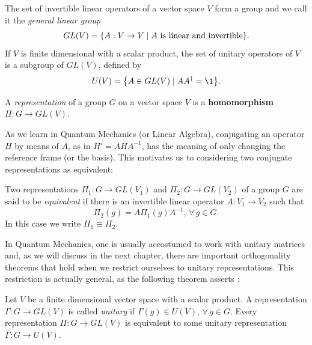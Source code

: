 \begin{definition}
The set of invertible linear operators of a vector space $V$ form a group and we call it the \textit{general linear group}
$$
GL(V) = \qty{A: V \to V \mid A \text{ is linear and invertible}}.
$$
If $V$ is finite dimensional with a scalar product, the set of unitary operators of $V$ is a subgroup of $GL(V)$, defined by
$$
U(V) = \qty{A \in GL(V) \mid A A^\dagger = \1}.
$$
\end{definition}

\begin{definition}
A \textit{representation} of a group $G$ on a vector space $V$ is a \textbf{homomorphism} $\Pi: G \to GL(V)$.
\end{definition}

As we learn in Quantum Mechanics (or Linear Algebra), conjugating an operator $H$ by means of $A$, as in $H' = A H A^{-1}$, has the meaning of only changing the reference frame (or the basis). This motivates us to considering two conjugate representations as equivalent:
\begin{definition}
Two representations $\Pi_1: G \to GL(V_1)$ and $\Pi_2: G \to GL(V_2)$ of a group $G$ are said to be \textit{equivalent} if there is an invertible linear operator $A: V_1 \to V_2$ such that
\begin{equation} \label{eq:intertwiner}
\Pi_2(g) = A \Pi_1(g) A^{-1}, \, \forall \, g \in G.
\end{equation}
In this case we write $\Pi_1 \equiv \Pi_2$.
\end{definition}

In Quantum Mechanics, one is usually accostumed to work with unitary matrices and, as we will discuss in the next chapter, there are important orthogonality theorems that hold when we restrict ourselves to unitary representations. This restriction is actually general, as the following theorem asserts \cite{dresselhaus}:
\begin{theorem} \label{th:unitarity_rep}
Let $V$ be a finite dimensional vector space with a scalar product. A representation $\Gamma: G \to GL(V)$ is called \textit{unitary} if $\Gamma(g) \in U(V)$, $\forall \, g \in G$. Every representation $\Pi: G \to GL(V)$ is equivalent to some unitary representation $\Gamma: G \to U(V)$.
\end{theorem}

